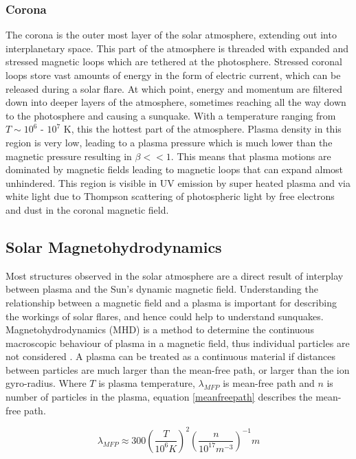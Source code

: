 \subsubsection{Corona}
The corona is the outer most layer of the solar atmosphere, extending out into interplanetary space. This part of the atmosphere is threaded with expanded and stressed magnetic loops which are tethered at the photosphere. Stressed coronal loops store vast amounts of energy in the form of electric current, which can be released during a solar flare. At which point, energy and momentum are filtered down into deeper layers of the atmosphere, sometimes reaching all the way down to the photosphere and causing a sunquake. With a temperature ranging from $T\sim10^{6}$ - $10^{7}$ K, this the hottest part of the atmosphere. Plasma density in this region is very low, leading to a plasma pressure which is much lower than the magnetic pressure resulting in $\beta << 1$. This means that plasma motions are dominated by magnetic fields leading to magnetic loops that can expand almost unhindered. This region is visible in UV emission by super heated plasma and via white light due to Thompson scattering of photospheric light by free electrons and dust in the coronal magnetic field. 



\subsection{Solar Magnetohydrodynamics}\label{MHD}
Most structures observed in the solar atmosphere are a direct result of interplay between plasma and the Sun's dynamic magnetic field. Understanding the relationship between a magnetic field and a plasma is important for describing the workings of solar flares, and hence could help to understand sunquakes. Magnetohydrodynamics (MHD) is a method to determine the continuous macroscopic behaviour of plasma in a magnetic field, thus individual particles are not considered \citep{1982soma.book.....P}. A plasma can be treated as a continuous material if distances between particles are much larger than the mean-free path, or larger than the ion gyro-radius. Where $T$ is plasma temperature, $\lambda_{MFP}$ is mean-free path and $n$ is number of particles in the plasma, equation \ref{meanfreepath} describes the mean-free path. 

\begin{equation}\label{meanfreepath}
\lambda_{MFP}\approx300(\frac{T}{10^{6}K})^{2}(\frac{n}{10^{17}m^{-3}})^{-1}m
\end{equation}

